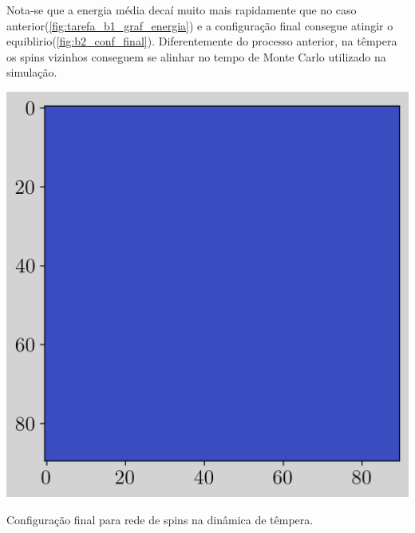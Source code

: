 Nota-se que a energia média decaí muito mais rapidamente que no caso anterior(\ref{fig:tarefa_b1_graf_energia})
e a configuração final consegue atingir o equiblirio(\ref{fig:b2_conf_final}). Diferentemente do processo anterior, na têmpera 
os spins vizinhos conseguem se alinhar no tempo de Monte Carlo utilizado na simulação.

\begin{marginfigure}
    \centering
    \includegraphics[width=0.8\linewidth]{graficos/tarefa-2/graf-tarefa-B2-conf-final.png}
    \caption{Configuração final para rede de spins na dinâmica de têmpera.}
    \label{fig:b2_conf_final}
\end{marginfigure}